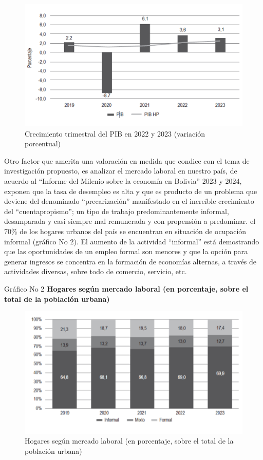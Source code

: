 \documentclass[Royal,times,sageh]{sagej}
\begin{document}
\begin{figure}

{\centering \includegraphics[width=1\linewidth]{Imagen 1} 

}

\caption{Crecimiento trimestral del PIB en 2022 y 2023 (variación porcentual)}\label{fig:i1}
\end{figure}

Otro factor que amerita una valoración en medida que condice con el tema
de investigación propuesto, es analizar el mercado laboral en nuestro
país, de acuerdo al ``Informe del Milenio sobre la economía en Bolivia''
2023 y 2024, exponen que la tasa de desempleo es alta y que es producto
de un problema que deviene del denominado ``precarización'' manifestado
en el increíble crecimiento del ``cuentapropismo''; un tipo de trabajo
predominantemente informal, desamparada y casi siempre mal remunerada y
con propensión a predominar. el 70\% de los hogares urbanos del país se
encuentran en situación de ocupación informal (gráfico No 2). El aumento
de la actividad ``informal'' está demostrando que las oportunidades de
un empleo formal son menores y que la opción para generar ingresos se
concentra en la formación de economías alternas, a través de actividades
diversas, sobre todo de comercio, servicio, etc.

Gráfico No 2 \textbf{Hogares según mercado laboral (en porcentaje, sobre
el total de la población urbana)}

\begin{figure}

{\centering \includegraphics[width=0.8\linewidth]{Imagen 2} 

}

\caption{Hogares según mercado laboral (en porcentaje, sobre el total de la población urbana)}\label{fig:i2}
\end{figure}
\end{document}
